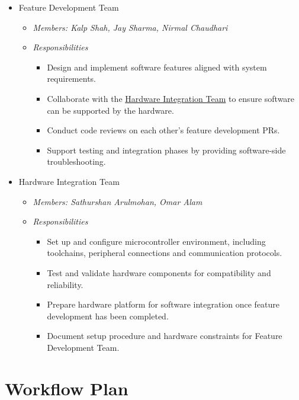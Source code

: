 \documentclass{article}
\begin{document}
\begin {itemize}
  \item Feature Development Team
  \begin{itemize}
    \item \textit{Members: Kalp Shah, Jay Sharma, Nirmal Chaudhari}
    \item \textit{Responsibilities}
      \begin{itemize}
        \item Design and implement software features aligned with system 
        requirements. 
        \item Collaborate with the
        \hyperref[hardware_integration_team]{Hardware Integration Team}
        to ensure software  can be supported by the hardware. 
        \item Conduct code reviews on each other's feature development PRs. 
        \item Support testing and integration phases by providing software-side 
        troubleshooting. 
      \end{itemize} 
  \end{itemize}

  \item Hardware Integration Team \label{hardware_integration_team}
    \begin{itemize}
      \item \textit{Members: Sathurshan Arulmohan, Omar Alam}
      \item \textit{Responsibilities}
        \begin{itemize}
          \item Set up and configure microcontroller environment, including 
          toolchains, peripheral connections and communication protocols. 
          \item Test and validate hardware components for compatibility and 
          reliability. 
          \item Prepare hardware platform for software integration once feature 
          development has been completed. 
          \item Document setup procedure and hardware constraints for Feature 
          Development Team. 
        \end{itemize} 
    \end{itemize}
\end{itemize}

\section{Workflow Plan}
\end{document}
